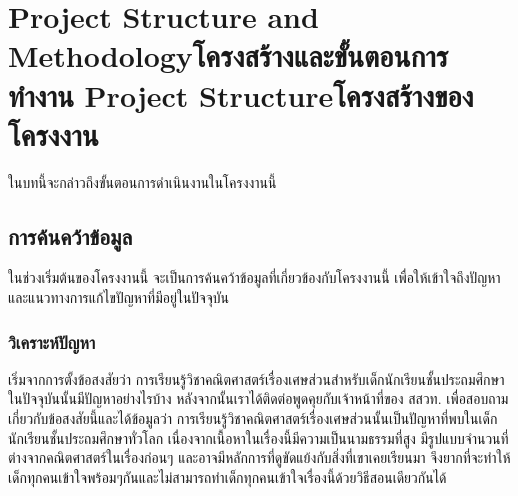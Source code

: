 \chapter{\ifproject%
\ifenglish Project Structure and Methodology\else โครงสร้างและขั้นตอนการทำงาน\fi
\else%
\ifenglish Project Structure\else โครงสร้างของโครงงาน\fi
\fi
}

ในบทนี้จะกล่าวถึงขั้นตอนการดำเนินงานในโครงงานนี้

\makeatletter


\makeatother

\section{การค้นคว้าข้อมูล}
ในช่วงเริ่มต้นของโครงงานนี้ จะเป็นการค้นคว้าข้อมูลที่เกี่ยวข้องกับโครงงานนี้ เพื่อให้เข้าใจถึงปัญหาและแนวทางการแก้ไขปัญหาที่มีอยู่ในปัจจุบัน

\subsection{วิเคราะห์ปัญหา}
 เริ่มจากการตั้งข้อสงสัยว่า การเรียนรู้วิชาคณิตศาสตร์เรื่องเศษส่วนสำหรับเด็กนักเรียนชั้นประถมศึกษาในปัจจุบันนั้นมีปัญหาอย่างไรบ้าง
 หลังจากนั้นเราได้ติดต่อพูดคุยกับเจ้าหน้าที่ของ สสวท. เพื่อสอบถามเกี่ยวกับข้อสงสัยนี้และได้ข้อมูลว่า การเรียนรู้วิชาคณิตศาสตร์เรื่องเศษส่วนนั้นเป็นปัญหาที่พบในเด็กนักเรียนชั้นประถมศึกษาทั่วโลก
 เนื่องจากเนื้อหาในเรื่องนี้มีความเป็นนามธรรมที่สูง มีรูปแบบจำนวนที่ต่างจากคณิตศาสตร์ในเรื่องก่อนๆ และอาจมีหลักการที่ดูขัดแย้งกับสิ่งที่เขาเคยเรียนมา จึงยากที่จะทำให้เด็กทุกคนเข้าใจพร้อมๆกันและไม่สามารถทำเด็กทุกคนเข้าใจเรื่องนี้ด้วยวิธีสอนเดียวกันได้

